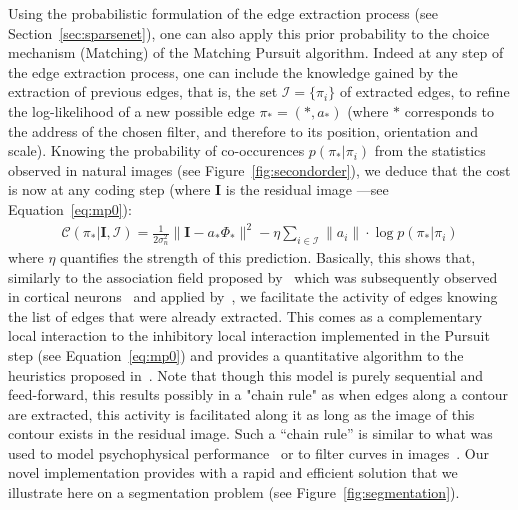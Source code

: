 \documentclass[a4paper, 11pt]{book}
\newcommand{\image}{\mathbf{I}} %
\begin{document}
Using the probabilistic formulation of the edge extraction process (see Section~\ref{sec:sparsenet}), one can also apply this prior probability to the choice mechanism (Matching) of the Matching Pursuit algorithm.
Indeed at any step of the edge extraction process, one can include the knowledge gained by the extraction of previous edges, that is, the set  $\mathcal{I} =\{\pi_i\}$ of extracted edges, to refine the log-likelihood of a new possible edge $\pi_\ast=(\ast, a_\ast)$ (where $\ast$ corresponds to the address of the chosen filter, and therefore to its position, orientation and scale).
Knowing the probability of co-occurences $p ( \pi_\ast | \pi_i)$ from the statistics observed in natural images (see Figure~\ref{fig:secondorder}), we deduce that the cost is now at any coding step (where $\image$ is the residual image ---see Equation~\ref{eq:mp0}):
\begin{eqnarray}%
\mathcal{C}(\pi_\ast | \image, \mathcal{I}) = \frac{1}{2\sigma_n^2} \| \image - a_\ast \Phi_\ast \|^2  - \eta \sum_{i\in \mathcal{I}} \| a_i \| \cdot \log p ( \pi_\ast | \pi_i)%
\label{eq:efficiency_cooc}%
\end{eqnarray}%
where $\eta$ quantifies the strength of this prediction. 
Basically, this shows that, similarly to the association field proposed by~\citep{Grossberg84} which was subsequently observed in cortical neurons~\citep{vonderHeydt84} and applied by~\citep{Field93},
we facilitate the activity of edges knowing the list of edges that were already extracted.
This comes as a complementary local interaction to the inhibitory local interaction implemented in the Pursuit step (see Equation~\ref{eq:mp0})
and provides a quantitative algorithm to the heuristics proposed in~\citep{Fischer07}.
Note that though this model is purely sequential and feed-forward, this results possibly in a "chain rule" as when edges along a contour are extracted,
this activity is facilitated along it as long as the image of this contour exists in the residual image.
Such a ``chain rule'' is similar to what was used to model psychophysical performance~\citep{Geisler01} or to filter curves in images~\citep{August01}.
Our novel implementation provides with a rapid and efficient solution that we illustrate here on a segmentation problem (see Figure~\ref{fig:segmentation}).
\end{document}
